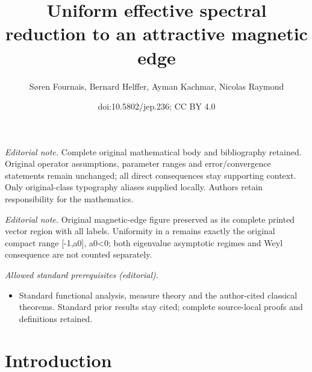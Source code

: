 \documentclass[10pt]{amsart}
\title{Uniform effective spectral reduction to an attractive magnetic edge}
\author{Søren Fournais, Bernard Helffer, Ayman Kachmar, Nicolas Raymond}
\date{doi:10.5802/jep.236; CC BY 4.0}
\theoremstyle{plain}
\theoremstyle{definition}
\providecommand{\mainmatter}{}\providecommand{\backmatter}{}
\begin{document}
\maketitle
\noindent\textit{Editorial note.} Complete original mathematical body and bibliography retained. Original operator assumptions, parameter ranges and error/convergence statements remain unchanged; all direct consequences stay supporting context. Only original-class typography aliases supplied locally. Authors retain responsibility for the mathematics.\par\medskip
\noindent\textit{Editorial note.} Original magnetic-edge figure preserved as its complete printed vector region with all labels. Uniformity in a remains exactly the original compact range [-1,a0], a0<0; both eigenvalue asymptotic regimes and Weyl consequence are not counted separately.\par\medskip
\noindent\textit{Allowed standard prerequisites (editorial).}\begin{itemize}
\item Standard functional analysis, measure theory and the author-cited classical theorems. Standard prior results stay cited; complete source-local proofs and definitions retained.
\end{itemize}\medskip
\tableofcontents
\mainmatter

\section{Introduction}\label{sec:intro}
\end{document}
